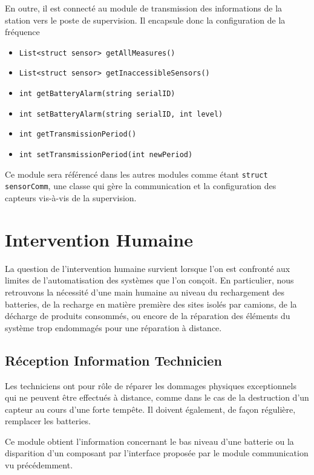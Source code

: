 En outre, il est connecté au module de transmission des informations de la station vers le poste de supervision. Il encapsule donc la configuration de la fréquence 

\begin{itemize}
\item \tt{List<struct sensor> getAllMeasures()}
\item \tt{List<struct sensor> getInaccessibleSensors()}
\item \tt{int getBatteryAlarm(string serialID)}
\item \tt{int setBatteryAlarm(string serialID, int level)}
\item \tt{int getTransmissionPeriod()}
\item \tt{int setTransmissionPeriod(int newPeriod)}
\end{itemize}

Ce module sera référencé dans les autres modules comme étant \texttt{struct sensorComm}, une classe qui gère la communication et la configuration des capteurs vis-à-vis de la supervision.


\section{Intervention Humaine}

La question de l'intervention humaine survient lorsque l'on est confronté aux limites de l'automatisation des systèmes que l'on conçoit. En particulier, nous retrouvons la nécessité d'une main humaine au niveau du rechargement des batteries, de la recharge en matière première des sites isolés par camions, de la décharge de produits consommés, ou encore de la réparation des éléments du système trop endommagés pour une réparation à distance.

\subsection{Réception Information Technicien}

Les techniciens ont pour rôle de réparer les dommages physiques exceptionnels qui ne peuvent être effectués à distance, comme dans le cas de la destruction d'un capteur au cours d'une forte tempête. Il doivent également, de façon régulière, remplacer les batteries.

Ce module obtient l'information concernant le bas niveau d'une batterie ou la disparition d'un composant par l'interface proposée par le module communication vu précédemment.


